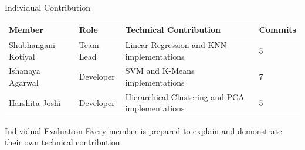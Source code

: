 \documentclass[aspectratio=169,11pt]{beamer}
\begin{document}
\begin{frame}{Individual Contribution}
\scriptsize
\begin{center}
\renewcommand{\arraystretch}{1.4}
\begin{tabularx}{.96\textwidth}{@{}p{2.5cm}p{1.8cm}X p{1.4cm}@{}}
\toprule
Member & Role & Technical Contribution & Commits\\
\midrule
Shubhangani Kotiyal	&Team Lead	&Linear Regression and KNN implementations	& 5\\
Ishanaya Agarwal	&Developer&	SVM and K-Means implementations	& 7\\
Harshita Joshi &	Developer	&Hierarchical Clustering and PCA implementations&	5\\
\bottomrule
\end{tabularx}
\end{center}

\vspace{3mm}
\begin{block}{Individual Evaluation}
\footnotesize
Every member is prepared to explain and demonstrate their own technical contribution.
\end{block}
\end{frame}
\end{document}
